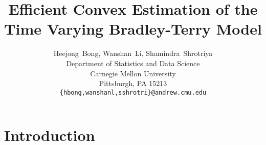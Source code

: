 \documentclass{article}
\title{Efficient Convex Estimation of the Time Varying Bradley-Terry Model}
\author{
  Heejong~Bong, Wanshan~Li, Shamindra~Shrotriya \\
  Department of Statistics and Data Science \\
  Carnegie Mellon University \\
  Pittsburgh, PA 15213 \\
  \texttt{\{hbong,wanshanl,sshrotri\}@andrew.cmu.edu} \\
}
\begin{document}

\maketitle


\section{Introduction}
\end{document}
